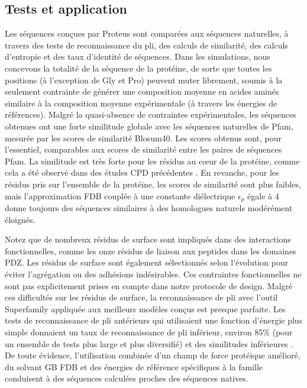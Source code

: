 \subsection{Tests et application}
Les séquences conçues par Proteus sont comparées aux séquences naturelles, à travers des tests de reconnaissance du pli, des calculs de similarité, des calculs d'entropie et des taux d'identité de séquences. Dans les simulations, nous concevons la totalité de la séquence de la protéine, de sorte que toutes les positions  (à l'exception de Gly et Pro) peuvent muter librement, soumis à la seulement contrainte de générer une composition moyenne en acides aminés similaire à la composition moyenne expérimentale (à travers les énergies de références). Malgré la quasi-absence de contraintes expérimentales, les séquences obtenues ont une forte similitude globale avec les séquences naturelles de Pfam, mesurée par les scores de similarité Blosum40. Les scores obtenus sont, pour l'essentiel, comparables aux scores de similarité entre les paires de séquences Pfam. La similitude est très forte pour les résidus au cœur de la protéine, comme cela a été observé dans des études CPD précédentes \cite{Schmidt08b,Simonson13}. En revanche, pour les résidus pris sur l'ensemble de la protéine, les scores de similarité sont plus faibles, mais l'approximation FDB couplée à une constante diélectrique $\epsilon_p$ égale à 4 donne toujours des séquences similaires à des homologues naturels modérément éloignés.

Notez que de nombreux résidus de surface sont impliqués dans des interactions fonctionnelles, comme les onze résidus de liaison aux peptides dans les domaines PDZ. Les résidus de surface sont également sélectionnés selon l'évolution pour éviter l'agrégation ou des adhésions indésirables. Ces contraintes fonctionnelles ne sont pas explicitement prises en compte dans notre protocole de design.  Malgré ces difficultés sur les résidus de surface, la reconnaissance de pli avec l'outil Superfamily  appliquée aux meilleurs modèles conçus est presque parfaite. Les tests de reconnaissance de pli antérieurs qui utilisaient une fonction d'énergie plus simple donnaient un taux de reconnaissance de pli inférieur, environ 85\% (pour un ensemble de tests plus large et plus diversifié) et des similitudes inférieures \cite{Schmidt10b,Schmidt09}. De toute évidence, l'utilisation combinée d'un champ de force protéique amélioré, du solvant GB FDB et des énergies de référence spécifiques à la famille conduisent à des séquences calculées proches des séquences natives.

